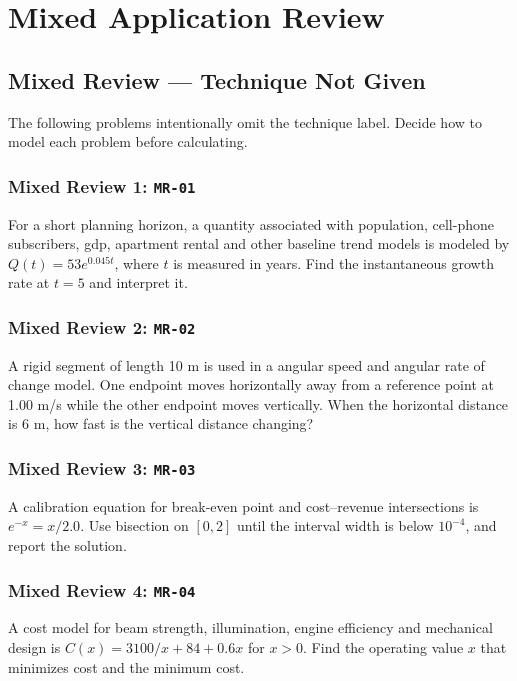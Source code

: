 \documentclass[11pt]{book}
\newcommand{\pid}[1]{\texttt{#1}}
\newcommand{\workspace}{\par\vspace{0.7in}\hrulefill\par\vspace{0.55in}\hrulefill\par}
\begin{document}
\part{Mixed Application Review}
\chapter{Mixed Review — Technique Not Given}
The following problems intentionally omit the technique label. Decide how to model each problem before calculating.
\section*{Mixed Review 1: \pid{MR-01}}
\begin{problembox}For a short planning horizon, a quantity associated with population, cell-phone subscribers, gdp, apartment rental and other baseline trend models is modeled by $Q(t)=53e^{0.045t}$, where $t$ is measured in years. Find the instantaneous growth rate at $t=5$ and interpret it.\end{problembox}
\workspace
\section*{Mixed Review 2: \pid{MR-02}}
\begin{problembox}A rigid segment of length 10 m is used in a angular speed and angular rate of change model. One endpoint moves horizontally away from a reference point at 1.00 m/s while the other endpoint moves vertically. When the horizontal distance is 6 m, how fast is the vertical distance changing?\end{problembox}
\workspace
\section*{Mixed Review 3: \pid{MR-03}}
\begin{problembox}A calibration equation for break-even point and cost–revenue intersections is $e^{-x}=x/2.0$. Use bisection on $[0,2]$ until the interval width is below $10^{-4}$, and report the solution.\end{problembox}
\workspace
\section*{Mixed Review 4: \pid{MR-04}}
\begin{problembox}A cost model for beam strength, illumination, engine efficiency and mechanical design is $C(x)=3100/x+84+0.6x$ for $x>0$. Find the operating value $x$ that minimizes cost and the minimum cost.\end{problembox}
\workspace
\end{document}
